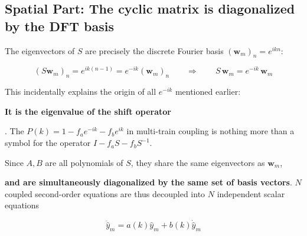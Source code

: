 \documentclass[11pt,a4paper,openany]{book}
\numberwithin{equation}{chapter}
\numberwithin{figure}{chapter}
\numberwithin{table}{chapter}
\begin{document}
\subsection{Spatial Part: The cyclic matrix is diagonalized by the DFT basis}










The eigenvectors of $S$ are precisely the discrete Fourier basis $\left(\mathbf w_m\right)_n = e^{ikn}$:

\begin{equation}
\left(S\mathbf w_m\right)_n = e^{ik(n-1)} = e^{-ik}\left(\mathbf w_m\right)_n
\qquad\Longrightarrow\qquad
S\,\mathbf w_m = e^{-ik}\,\mathbf w_m
\end{equation}










\begin{tcolorbox}[notebox]

This incidentally explains the origin of all $e^{-ik}$ mentioned earlier:




\textbf{It is the eigenvalue of the shift operator}




. The $P(k)=1-f_ae^{-ik}-f_be^{ik}$ in multi-train coupling is nothing more than a symbol for the operator $I-f_aS-f_bS^{-1}$.







\end{tcolorbox}










Since $A,B$ are all polynomials of $S$, they share the same eigenvectors as $\mathbf w_m$,




\textbf{and are simultaneously diagonalized by the same set of basis vectors}. $N$ coupled second-order equations are thus decoupled into $N$ independent scalar equations

\begin{equation}
\ddot{\hat y}_m = a(k)\hat y_m + b(k)\dot{\hat y}_m
\end{equation}
\end{document}
